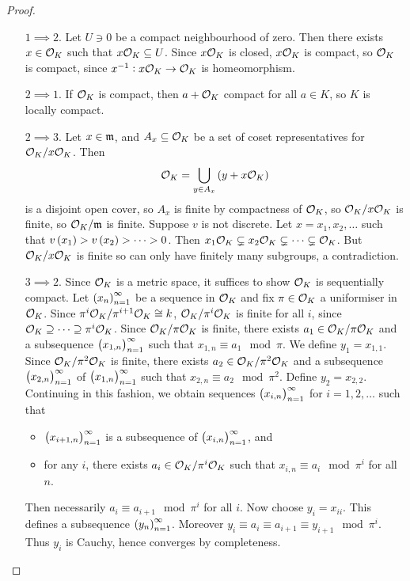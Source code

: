 \begin{proof}
\hfill
\begin{itemize}[leftmargin=0.5in]
\item[$ 1 \implies 2 $.] Let $ U \ni 0 $ be a compact neighbourhood of zero. Then there exists $ x \in \mathcal{O}_K $ such that $ x\mathcal{O}_K \subseteq U $. Since $ x\mathcal{O}_K $ is closed, $ x\mathcal{O}_K $ is compact, so $ \mathcal{O}_K $ is compact, since $ x^{-1} : x\mathcal{O}_K \to \mathcal{O}_K $ is homeomorphism.
\item[$ 2 \implies 1 $.] If $ \mathcal{O}_K $ is compact, then $ a + \mathcal{O}_K $ compact for all $ a \in K $, so $ K $ is locally compact.
\item[$ 2 \implies 3 $.] Let $ x \in \mathfrak{m} $, and $ A_x \subseteq \mathcal{O}_K $ be a set of coset representatives for $ \mathcal{O}_K / x\mathcal{O}_K $. Then
$$ \OOO_K = \bigcup_{y \in A_x} \br{y + x\OOO_K} $$
is a disjoint open cover, so $ A_x $ is finite by compactness of $ \mathcal{O}_K $, so $ \mathcal{O}_K / x\mathcal{O}_K $ is finite, so $ \mathcal{O}_K / \mathfrak{m} $ is finite. Suppose $ v $ is not discrete. Let $ x = x_1, x_2, \dots $ such that $ v\br{x_1} > v\br{x_2} > \dots > 0 $. Then $ x_1\mathcal{O}_K \subsetneq x_2\mathcal{O}_K \subsetneq \dots \subsetneq \mathcal{O}_K $. But $ \mathcal{O}_K / x\mathcal{O}_K $ is finite so can only have finitely many subgroups, a contradiction.
\item[$ 3 \implies 2 $.] Since $ \mathcal{O}_K $ is a metric space, it suffices to show $ \mathcal{O}_K $ is sequentially compact. Let $ \br{x_n}_{n = 1}^\infty $ be a sequence in $ \mathcal{O}_K $ and fix $ \pi \in \mathcal{O}_K $ a uniformiser in $ \mathcal{O}_K $. Since $ \pi^i\mathcal{O}_K / \pi^{i + 1}\mathcal{O}_K \cong k $, $ \mathcal{O}_K / \pi^i\mathcal{O}_K $ is finite for all $ i $, since $ \mathcal{O}_K \supseteq \dots \supseteq \pi^i\mathcal{O}_K $. Since $ \mathcal{O}_K / \pi\mathcal{O}_K $ is finite, there exists $ a_1 \in \mathcal{O}_K / \pi\mathcal{O}_K $ and a subsequence $ \br{x_{1, n}}_{n = 1}^\infty $ such that $ x_{1, n} \equiv a_1 \mod \pi $. We define $ y_1 = x_{1, 1} $. Since $ \mathcal{O}_K / \pi^2\mathcal{O}_K $ is finite, there exists $ a_2 \in \mathcal{O}_K / \pi^2\mathcal{O}_K $ and a subsequence $ \br{x_{2, n}}_{n = 1}^\infty $ of $ \br{x_{1, n}}_{n = 1}^\infty $ such that $ x_{2, n} \equiv a_2 \mod \pi^2 $. Define $ y_2 = x_{2, 2} $. Continuing in this fashion, we obtain sequences $ \br{x_{i, n}}_{n = 1}^\infty $ for $ i = 1, 2, \dots $ such that
\begin{itemize}
\item $ \br{x_{i + 1, n}}_{n = 1}^\infty $ is a subsequence of $ \br{x_{i, n}}_{n = 1}^\infty $, and
\item for any $ i $, there exists $ a_i \in \mathcal{O}_K / \pi^i\mathcal{O}_K $ such that $ x_{i, n} \equiv a_i \mod \pi^i $ for all $ n $.
\end{itemize}
Then necessarily $ a_i \equiv a_{i + 1} \mod \pi^i $ for all $ i $. Now choose $ y_i = x_{ii} $. This defines a subsequence $ \br{y_n}_{n = 1}^\infty $. Moreover $ y_i \equiv a_i \equiv a_{i + 1} \equiv y_{i + 1} \mod \pi^i $. Thus $ y_i $ is Cauchy, hence converges by completeness.
\end{itemize}
\end{proof}

